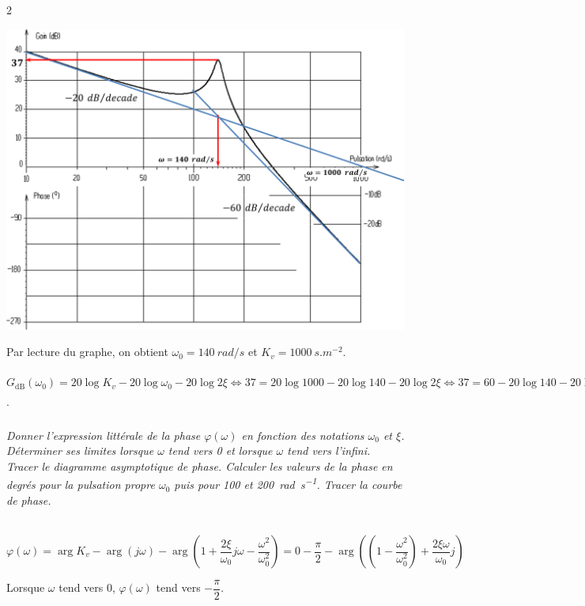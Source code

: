 \documentclass[10pt,fleqn]{article} %
\begin{document}
\begin{multicols}{2}
\begin{corrige}
\begin{center}
\includegraphics[width=\linewidth]{images/cor_01}
\end{center}
Par lecture du graphe, on obtient $\omega_0=\SI{140}{rad/s}$ et $K_v=\SI{1000}{s.m^{-2}}$.

$G_{\text{dB}}\left(\omega_0 \right)=
20\log K_v- 20\log  \omega_0 - 20\log 2\xi 
\Leftrightarrow 37=20\log 1000 - 20\log  140 - 20\log 2\xi
\Leftrightarrow 37=60 - 20\log  140 - 20\log 2\xi
\Leftrightarrow \dfrac{37-60 + 20\log  140}{-20} =\log 2\xi
\Leftrightarrow  \xi \simeq 0,05
$.

\end{corrige} \else \fi


\subparagraph{}\textit{Donner l'expression littérale de la phase $\varphi(\omega)$ en fonction des notations $\omega_0$ et $\xi$.	
Déterminer ses limites lorsque $\omega$ tend vers 0 et lorsque $\omega$ tend vers l'infini.	
Tracer le diagramme asymptotique de phase.	
Calculer les valeurs de la phase en degrés pour la pulsation propre $\omega_0$ puis pour \num{100} et \SI{200}{rad.s^{-1}}. Tracer la courbe de phase.}

\ifprof \begin{corrige} ~\\

$
\varphi\left(  \omega\right)
=\arg K_v- \arg \left( j\omega\right) - \arg  \left( 1+\dfrac{2\xi}{\omega_0} j\omega - \dfrac{\omega^2}{\omega_0^2}  \right)
=0-\dfrac{\pi}{2} - \arg  \left( \left( 1 - \dfrac{\omega^2}{\omega_0^2}\right) + \dfrac{2\xi\omega}{\omega_0} j \right)
$

Lorsque $\omega$ tend vers 0, $\varphi\left(\omega\right)$ 
tend vers $-\dfrac{\pi}{2}$. 


\end{corrige}
\end{multicols}
\end{document}

